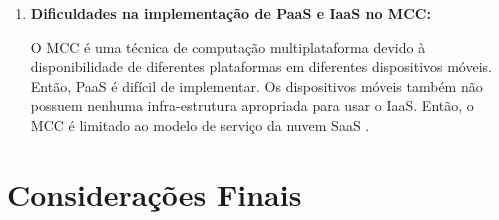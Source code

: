 \documentclass[12pt]{article}
\begin{document}
\begin{enumerate}
  \item \textbf{Dificuldades na implementação de PaaS e IaaS no MCC:}
  
  O MCC é uma técnica de computação multiplataforma devido à disponibilidade de diferentes plataformas em diferentes 
  dispositivos móveis. Então, PaaS é difícil de implementar. Os dispositivos móveis também não possuem nenhuma 
  infra-estrutura apropriada para usar o IaaS. Então, o MCC é limitado ao modelo de serviço da nuvem SaaS \cite{kumar2014}.
  

  
\end{enumerate}


\section{Considerações Finais}



\end{document}
